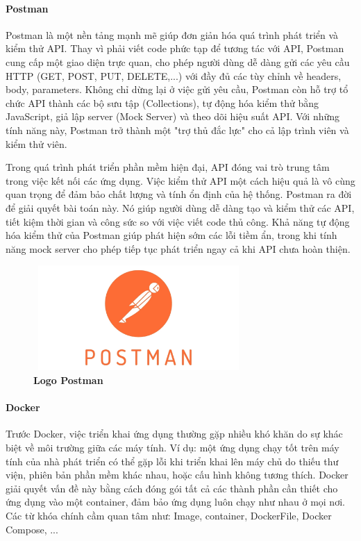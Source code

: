 \paragraph{Postman}
\mbox{}

Postman là một nền tảng mạnh mẽ giúp đơn giản hóa quá trình phát triển và kiểm thử API. Thay vì phải viết code phức tạp để tương tác với API, Postman cung cấp một giao diện trực quan, cho phép người dùng dễ dàng gửi các yêu cầu HTTP (GET, POST, PUT, DELETE,...) với đầy đủ các tùy chỉnh về headers, body, parameters. Không chỉ dừng lại ở việc gửi yêu cầu, Postman còn hỗ trợ tổ chức API thành các bộ sưu tập (Collections), tự động hóa kiểm thử bằng JavaScript, giả lập server (Mock Server) và theo dõi hiệu suất API. Với những tính năng này, Postman trở thành một "trợ thủ đắc lực" cho cả lập trình viên và kiểm thử viên.

Trong quá trình phát triển phần mềm hiện đại, API đóng vai trò trung tâm trong việc kết nối các ứng dụng. Việc kiểm thử API một cách hiệu quả là vô cùng quan trọng để đảm bảo chất lượng và tính ổn định của hệ thống. Postman ra đời để giải quyết bài toán này. Nó giúp người dùng dễ dàng tạo và kiểm thử các API, tiết kiệm thời gian và công sức so với việc viết code thủ công. Khả năng tự động hóa kiểm thử của Postman giúp phát hiện sớm các lỗi tiềm ẩn, trong khi tính năng mock server cho phép tiếp tục phát triển ngay cả khi API chưa hoàn thiện.

\begin{figure}[H]
	\centering
	\includegraphics[width=8cm,height=4cm]{Images/Technology/postman.jpg}
	\caption[Logo Postman]{\bfseries \fontsize{12pt}{0pt}
		\selectfont Logo Postman}
	\label{postman} %
\end{figure}


\paragraph{Docker}
\mbox{}

Trước Docker, việc triển khai ứng dụng thường gặp nhiều khó khăn do sự khác biệt về môi trường giữa các máy tính. Ví dụ: một ứng dụng chạy tốt trên máy tính của nhà phát triển có thể gặp lỗi khi triển khai lên máy chủ do thiếu thư viện, phiên bản phần mềm khác nhau, hoặc cấu hình không tương thích. Docker giải quyết vấn đề này bằng cách đóng gói tất cả các thành phần cần thiết cho ứng dụng vào một container, đảm bảo ứng dụng luôn chạy như nhau ở mọi nơi. Các từ khóa chính cầm quan tâm như: Image, container, DockerFile, Docker Compose, ...


